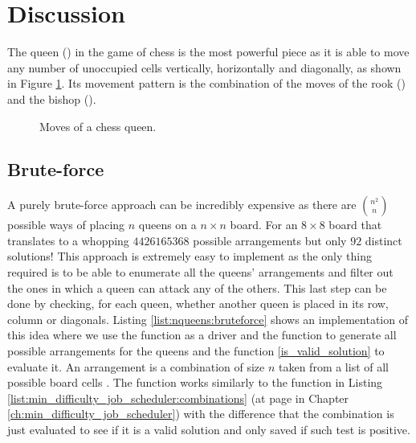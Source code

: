 \section{Discussion}
\label{nqueens:sec:discussion}
The queen (\symqueen) in the game of chess is the most powerful piece as it is able to move any
number of unoccupied cells vertically, horizontally and diagonally, as shown in Figure
\ref{fig:nqueens:queen_movements}. Its movement pattern is the combination of the moves of the rook
(\symrook) and the bishop (\symbishop).

\begin{figure}
	\centering 
	\def\myfen{8/8/8/8/8/3q3/8/8 w - - 0 1} \chessboard[setfen=\myfen, pgfstyle=straightmove,
	arrow=stealth, linewidth=.3ex, padding=2ex, color=black!75!white, shortenstart=1.15ex,
	showmover=false, markmoves={d3-h7,d3-a6,d3-b1,d3-f1,d3-d8,d3-d1,d3-a3,d3-h3}] 
	\caption{Moves of a chess queen.}
	 \label{fig:nqueens:queen_movements}
\end{figure}



\subsection{Brute-force}
\label{nqueens:sec:bruteforce}

A purely brute-force approach can be incredibly expensive as there are ${n^2 \choose n}$ possible
ways of placing $n$ queens on a $n \times n$ board. For an $8 \times 8$ board that translates to a
whopping $4426165368$ possible arrangements but only $92$ distinct solutions! This approach is
extremely easy to implement as the only thing required is to be able to enumerate all the
queens' arrangements and filter out the ones in which a queen can attack any of the others. This
last step can be done by checking, for each queen, whether another queen is placed in its row,
column or diagonals. Listing \ref{list:nqueens:bruteforce} shows an implementation of this idea where we
use the function  as a driver and the function
 to generate all possible arrangements for the queens and the
function \ref{is_valid_solution} to evaluate it. An arrangement is a combination of size $n$ taken
from a list of all possible board cells . The function
 works similarly to the function  in
Listing \ref{list:min_difficulty_job_scheduler:combinations} (at page
\pageref{list:min_difficulty_job_scheduler:combinations} in Chapter
\ref{ch:min_difficulty_job_scheduler}) with the difference that the combination is just evaluated to
see if it is a valid solution and only saved if such test is positive.

